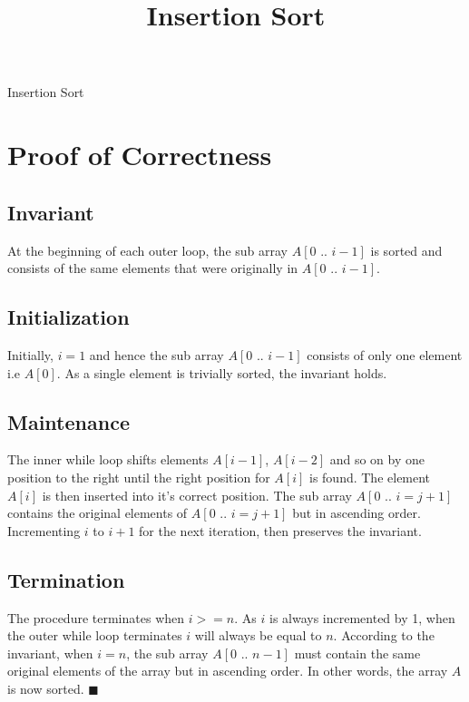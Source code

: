 \documentclass[10pt,a4paper]{article}
\title{Insertion Sort}
\date{}
\begin{document}
\maketitle

\begin{algorithm}[H]
 \caption{Insertion Sort}
\end{algorithm}

\section{Proof of Correctness}
\subsection{Invariant}
At the beginning of each outer loop, the sub array $A[0 \text{ .. } i-1]$ is sorted 
and consists of the same elements that were originally in $A[0 \text{ .. } i-1]$.

\subsection{Initialization}
Initially, $i = 1$ and hence the sub array $A[0 \text{ .. } i-1]$ consists of only one 
element i.e $A[0]$. As a single element is trivially sorted, the invariant holds.

\subsection{Maintenance}
The inner while loop shifts elements $A[i-1]$, $A[i-2]$ and so on by one position to
the right until the right position for $A[i]$ is found. The element $A[i]$ is then 
inserted into it's correct position. The sub array $A[0 \text{ .. } i = j+1]$ contains 
the original elements of $A[0 \text{ .. } i = j+1]$  but in ascending order. Incrementing $i$
to $i + 1$ for the next iteration, then preserves the invariant.

\subsection{Termination}
The procedure terminates when $ i >= n$. As $i$ is always incremented by 1, when the
outer while loop terminates $i$ will always be equal to $n$. According to the invariant, when $i = n$,
the sub array $A[0 \text{ .. } n-1]$ must contain the same original elements of the array
but in ascending order. In other words, the array $A$ is now sorted. $\blacksquare$

	
\end{document}
